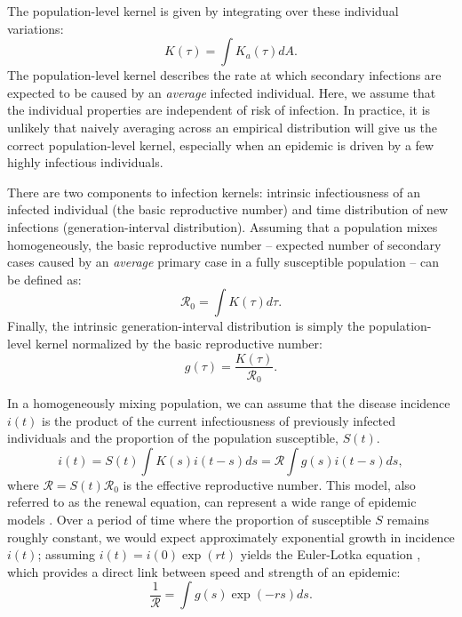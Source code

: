 \documentclass[12pt]{article}
\newcommand{\RR}{\ensuremath{{\mathcal R}}}
\begin{document}
The population-level kernel is given by integrating over these individual variations:
\begin{equation}
K(\tau) = \int K_a (\tau) dA.
\end{equation}
The population-level kernel describes the rate at which secondary infections are expected to be caused by an \emph{average} infected individual.
Here, we assume that the individual properties are independent of risk of infection.
In practice, it is unlikely that naively averaging across an empirical distribution will give us the correct population-level kernel, especially when an epidemic is driven by a few highly infectious individuals.

There are two components to infection kernels: intrinsic infectiousness of an infected individual (the basic reproductive number) and time distribution of new infections (generation-interval distribution).
Assuming that a population mixes homogeneously, the basic reproductive number -- expected number of secondary cases caused by an \emph{average} primary case in a fully susceptible population -- can be defined as: 
\begin{equation}
\RR_0 = \int K(\tau) d\tau.
\end{equation}
Finally, the intrinsic generation-interval distribution is simply the population-level kernel normalized by the basic reproductive number:
\begin{equation}
g(\tau) = \frac{K(\tau)}{\RR_0}.
\end{equation}

In a homogeneously mixing population, we can assume that the disease incidence $i(t)$ is the product of the current infectiousness of previously infected individuals and the proportion of the population susceptible, $S(t)$.
\begin{equation}
i(t) = S(t) \int K(s) i(t-s) ds = \RR \int g(s) i(t-s) ds,
\end{equation}
where $\RR = S(t) \RR_0$ is the effective reproductive number.
This model, also referred to as the renewal equation, can represent a wide range of epidemic models \citep{heesterbeek1996concept, diekmann2000mathematical, roberts2004modelling, aldis2005integral, wallinga2007generation, roberts2007model}.
Over a period of time where the proportion of susceptible $S$ remains roughly constant, we would expect approximately exponential growth in incidence $i(t)$; assuming $i(t) = i(0) \exp(r t)$ yields the Euler-Lotka equation \citep{lotka1907relation}, which provides a direct link between speed and strength of an epidemic:
\begin{equation}
\frac{1}{\RR} = \int g(s) \exp(-r s) ds.
\end{equation}
\end{document}
